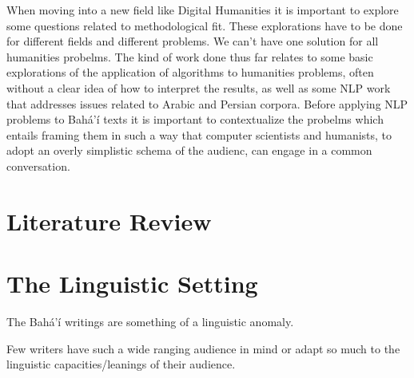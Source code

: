 \documentclass[12pt, oneside]{report}
\begin{document}
When moving into a new field like Digital Humanities it is important to explore some questions related to methodological fit. These explorations have to be done for different fields and different problems. We can't have one solution for all humanities probelms. The kind of work done thus far relates to some basic explorations of the application of algorithms to humanities problems, often without a clear idea of how to interpret the results, as well as some NLP work that addresses issues related to Arabic and Persian corpora. Before applying NLP problems to Bahá'í texts it is important to contextualize the probelms which entails framing them in such a way that computer scientists and humanists, to adopt an overly simplistic schema of the audienc, can engage in a common conversation.
\chapter{Literature Review}
	
\chapter{The Linguistic Setting}
\par 

\par
The Bah\'{a}'\'{i} writings are something of a linguistic anomaly.
\par
Few writers have such a wide ranging audience in mind or adapt so much to the linguistic capacities/leanings of their audience.
\end{document}
